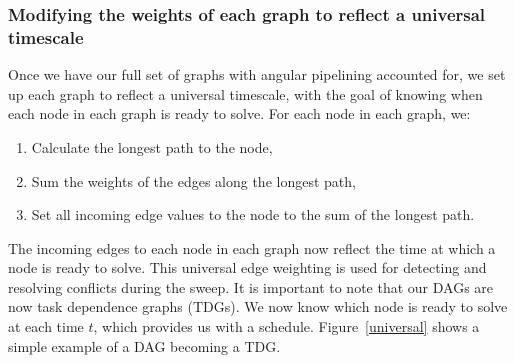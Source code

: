 \documentclass[times,final]{elsarticle}
\begin{document}
\subsubsection{Modifying the weights of each graph to reflect a universal timescale}\label{sec:universal}

Once we have our full set of graphs with angular pipelining accounted for, we set up each graph to reflect a universal timescale, with the goal of knowing when each node in each graph is ready to solve.
For each node in each graph, we:
\begin{enumerate}
  \item Calculate the longest path to the node,
  \item Sum the weights of the edges along the longest path,
  \item Set all incoming edge values to the node to the sum of the longest path.
\end{enumerate}
The incoming edges to each node in each graph now reflect the time at which a node is ready to solve. This universal edge weighting is used for detecting and resolving conflicts during the sweep. It is important to note that our DAGs are now task dependence graphs (TDGs). We now know which node is ready to solve at each time $t$, which provides us with a schedule. Figure~\ref{universal} shows a simple example of a DAG becoming a TDG.
\end{document}
